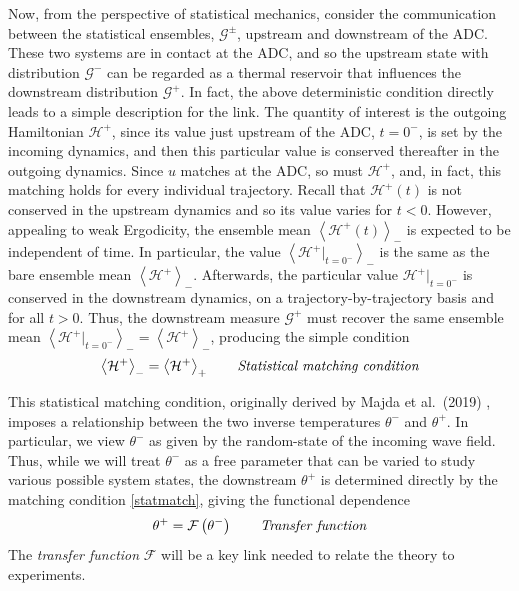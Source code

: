 \documentclass[11pt]{article}
\newcommand{\mean}[1]{\left< #1 \right>}
\newcommand{\depth}{d}
\newcommand{\Ham}{\mathcal{H}}
\newcommand{\Hdn}{\Ham^{+}}
\newcommand{\Gibbs}{\mathcal{G}}
\newcommand{\Gup}{\Gibbs^{-}}
\newcommand{\Gdn}{\Gibbs^{+}}
\newcommand{\Gupdn}{\Gibbs^{\pm}}
\newcommand{\thup}{\theta^{-}}
\newcommand{\thdn}{\theta^{+}}
\newcommand{\meanup}[1]{\mean{#1}_{-}}
\newcommand{\meandn}[1]{\mean{#1}_{+}}
\newcommand{\transf}{\mathcal{F}}
\begin{document}
	Now, from the perspective of statistical mechanics, consider the communication between the statistical ensembles, $\Gupdn$, upstream and downstream of the ADC. These two systems are in contact at the ADC, and so the upstream state with distribution $\Gup$ can be regarded as a thermal reservoir that influences the downstream distribution $\Gdn$. In fact, the above deterministic  condition directly leads to a simple description for the link. The quantity of interest is the outgoing Hamiltonian $\Hdn$, since its value just upstream of the ADC, $t=0^{-}$, is set by the incoming dynamics, and then this particular value is conserved thereafter in the outgoing dynamics. Since $u$ matches at the ADC, so must $\Hdn$, and, in fact, this matching holds for every individual trajectory. Recall that $\Hdn(t)$ is not conserved in the upstream dynamics and so its value varies for $t < 0$. However, appealing to weak Ergodicity, the ensemble mean $\meanup{\Hdn(t)}$ is expected to be independent of time. In particular, the value $\meanup{\Hdn \vert_{t=0^{-}} }$ is the same as the bare ensemble mean $\meanup{\Hdn}$. Afterwards, the particular value $\Hdn \vert_{t=0^{-}}$ is conserved in the downstream dynamics, on a trajectory-by-trajectory basis and for all $t>0$. Thus, the downstream measure $\Gdn$ must recover the same ensemble mean $\meanup{\Hdn \vert_{t=0^{-}} } = \meanup{\Hdn}$, producing the simple condition
\begin{align}
\label{statmatch}
\meanup{\Hdn} = \meandn{\Hdn}
\qquad \mbox{\em Statistical matching condition}
\end{align}

	This statistical matching condition, originally derived by Majda et al.~(2019) \cite{majda2019}, imposes a relationship between the two inverse temperatures $\thup$ and $\thdn$. In particular, we view $\thup$ as given by the random-state of the incoming wave field. Thus, while we will treat $\thup$ as a free parameter that can be varied to study various possible system states, the downstream $\thdn$ is determined directly by the matching condition \eqref{statmatch}, giving the functional dependence
\begin{equation}
\thdn = \transf \left( \thup \right)
\qquad \mbox{\em Transfer function}
\end{equation}
The {\em transfer function} $\transf$ will be a key link needed to relate the theory to experiments.

\end{document}
